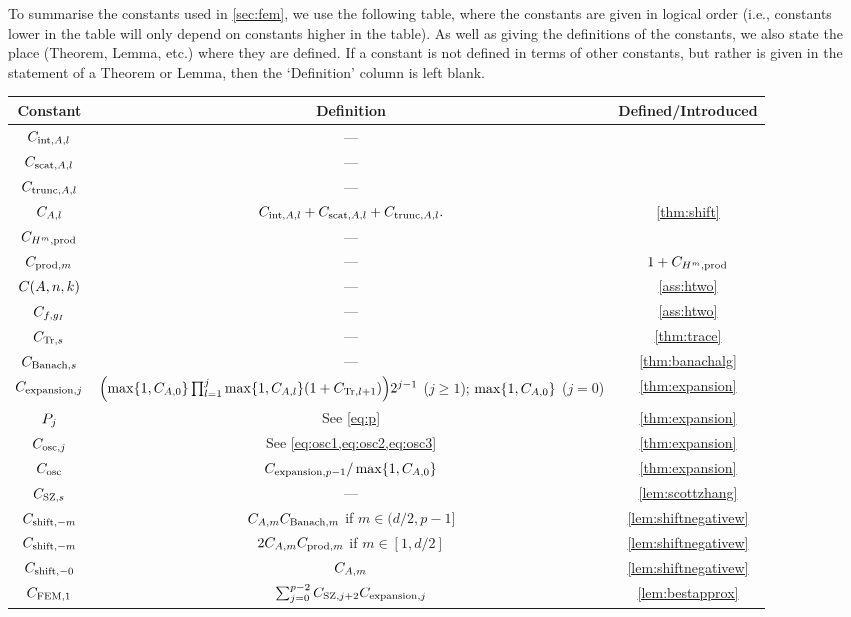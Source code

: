 To summarise the constants used in \cref{sec:fem}, we use the following table, where the constants are given in logical order (i.e., constants lower in the table will only depend on constants higher in the table). As well as giving the definitions of the constants, we also state the place (Theorem, Lemma, etc.) where they are defined. If a constant is not defined in terms of other constants, but rather is given in the statement of a Theorem or Lemma, then the `Definition' column is left blank.

\begin{longtabu}{ccc}
  \toprule
  Constant & Definition & Defined/Introduced\\
  \midrule
  \endhead
  $C_{\mathrm{int},A,l}$ & ---& \cite[Theorem 4.16]{Mc:00}\\
  $C_{\mathrm{scat},A,l}$ & ---& \cite[Theorem 4.18(i)]{Mc:00}\\
    $C_{\mathrm{trunc},A,l}$ & ---& \cite[Theorem 4.18(ii)]{Mc:00}\\
  $C_{A,l}$ & $C_{\mathrm{int},A,l} + C_{\mathrm{scat},A,l} + C_{\mathrm{trunc},A,l}.$ & \cref{thm:shift}\\
  $C_{H^{m},\mathrm{prod}}$&---&\cite[Theorem 3.20]{Mc:00}\\ 
  $C_{\mathrm{prod},m}$ &---& $1+C_{H^{m},\mathrm{prod}}$\\
  $\CAnk$ &---& \cref{ass:htwo}\\
  $C_{f,g_{I}}$ &---& \cref{ass:htwo}\\
  $C_{\mathrm{Tr},s}$ &---& \cref{thm:trace}\\
  $C_{\mathrm{Banach},s}$ & --- & \cref{thm:banachalg}\\
  $C_{\mathrm{expansion},j}$ & $\mleft(\max\set{1,\CAz} \prod_{l=1}^j \max\set{1,\CAfn{l}} \mleft(1+\CTrfn{l+1}\mright)\mright)2^{j-1}$ ($j \geq 1$); $\max\set{1,\CAz}$ ($j=0$)& \cref{thm:expansion}\\
  $P_{j}$ & See \cref{eq:p}& \cref{thm:expansion}\\
  $C_{\mathrm{osc},j}$ & See \cref{eq:osc1,eq:osc2,eq:osc3} & \cref{thm:expansion}\\
  $C_{\mathrm{osc}}$ & $\Cefn{p-1}/\max\set{1,\CAz}$ & \cref{thm:expansion}\\
  $C_{\mathrm{SZ},s}$ &---& \cref{lem:scottzhang}\\
  $C_{\mathrm{shift},-m}$ &$C_{A,m}C_{\mathrm{Banach},m}$ if $ m \in (d/2,p-1]$& \cref{lem:shiftnegativew}\\
    $C_{\mathrm{shift},-m}$ &$2C_{A,m}C_{\mathrm{prod},m}$ if $m \in [1,d/2]$& \cref{lem:shiftnegativew}\\
      $C_{\mathrm{shift},-0}$ &$C_{A,m}$& \cref{lem:shiftnegativew}\\
  $C_{\mathrm{FEM},1}$ & $\sum_{j=0}^{p-2}C_{\mathrm{SZ},j+2}C_{\mathrm{expansion},j} $ & \cref{lem:bestapprox}\\

\end{longtabu}

